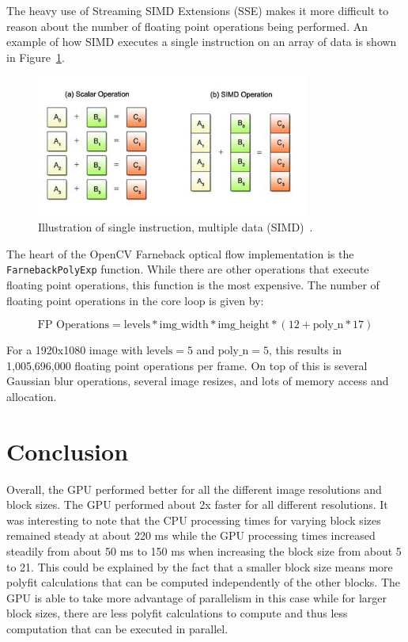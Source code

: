 \documentclass[12pt,letterpaper]{article}
\begin{document}
The heavy use of Streaming SIMD Extensions (SSE) makes it more difficult to
reason about the number of floating point operations being performed. An example
of how SIMD executes a single instruction on an array of data is shown in
Figure~\ref{fig:simd}.

\begin{figure}[h]
  \centering
    \includegraphics[width=0.8\textwidth]{img/simd.jpg}
  \caption{Illustration of single instruction, multiple data (SIMD)~\cite{simd}.}
  \label{fig:simd}
\end{figure}

The heart of the OpenCV Farneback optical flow implementation is the
\texttt{FarnebackPolyExp} function. While there are other operations that
execute floating point operations, this function is the most expensive. The
number of floating point operations in the core loop is given by:

$$
\text{FP Operations} = \text{levels} * \text{img\_width} * \text{img\_height}
                * (12 + \text{poly\_n} * 17)
$$

For a 1920x1080 image with $\text{levels}=5$ and $\text{poly\_n}=5$, this results in
1,005,696,000 floating point operations per frame. On top of this is several
Gaussian blur operations, several image resizes, and lots of memory access and
allocation.

\section{Conclusion}
Overall, the GPU performed better for all the different image resolutions and
block sizes. The GPU performed about 2x faster for all different resolutions.
It was interesting to note that the CPU processing times for varying block 
sizes remained steady at about 220 ms while the GPU processing times 
increased steadily from about 50 ms to 150 ms when increasing the block size
from about 5 to 21. This could be explained by the fact that a smaller block 
size means more polyfit calculations that can be computed independently
of the other blocks. The GPU is able to take more advantage of parallelism in
this case while for larger block sizes, there are less polyfit calculations to 
compute and thus less computation that can be executed in parallel.
\end{document}
